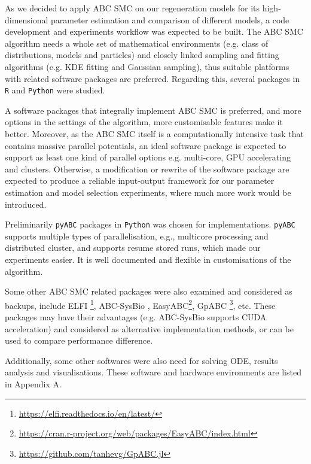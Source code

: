 

 As we decided to apply ABC SMC on our regeneration models for its high-dimensional parameter estimation and comparison of different models, a code development and experiments workflow was expected to be built. The ABC SMC algorithm needs a whole set of mathematical environments (e.g. class of distributions, models and particles) and closely linked sampling and fitting algorithms (e.g. KDE fitting and Gaussian sampling), thus suitable platforms with related software packages are preferred. Regarding this, several packages in \verb|R| and \verb|Python| were studied.

 A software packages that integrally implement ABC SMC is preferred, and more options in the settings of the algorithm, more customisable features make it better. Moreover, as the ABC SMC itself is a computationally intensive task that contains massive parallel potentials, an ideal software package is expected to support as least one kind of parallel options e.g. multi-core, GPU accelerating and clusters. Otherwise, a modification or rewrite of the software package are expected to produce a reliable input-output framework for our parameter estimation and model selection experiments, where much more work would be introduced.

 Preliminarily \verb|pyABC| packages \cite{ref:pyabc} in \verb|Python| was chosen for implementations. \verb|pyABC| supports multiple types of parallelisation, e.g., multicore processing and distributed cluster, and supports resume stored runs, which made our experiments easier. It is well documented and flexible in customisations of the algorithm.

 Some other ABC SMC related packages were also examined and considered as backups, include ELFI \footnote{\url{https://elfi.readthedocs.io/en/latest/}}, ABC-SysBio \cite{ref:abcsysbio}, EasyABC\footnote{\url{https://cran.r-project.org/web/packages/EasyABC/index.html}}, GpABC \footnote{\url{https://github.com/tanhevg/GpABC.jl}}, etc. These packages may have their advantages (e.g. ABC-SysBio supports CUDA acceleration) and considered as alternative implementation methods, or can be used to compare performance difference.

 Additionally, some other softwares were also need for solving ODE, results analysis and visualisations. These software and hardware environments are listed in Appendix A.